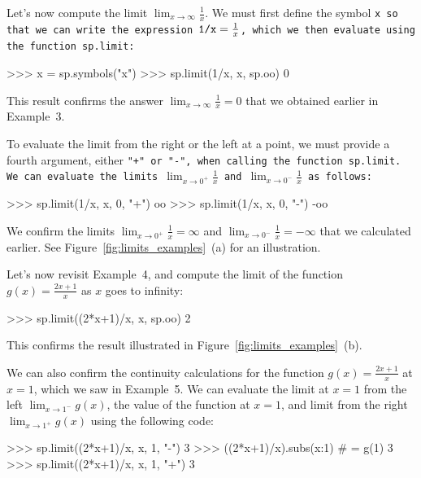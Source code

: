		Let's now compute the limit $\lim_{x \to \infty} \tfrac{1}{x}$.
		We must first define the symbol \tt{x}
		so that we can write the expression $\tt{1/x} = \frac{1}{x}$,
		which we then evaluate using the function \tt{sp.limit}:

		\begin{codeblock}[]
		>>> x = sp.symbols("x")
		>>> sp.limit(1/x, x, sp.oo)
		0
		\end{codeblock}

		\noindent
		This result confirms the answer $\lim_{x \to \infty} \tfrac{1}{x}=0$
		that we obtained earlier in Example~3.


		To evaluate the limit from the right or the left at a point,
		we must provide a fourth argument,
		either \tt{"+"} or \tt{"-"},
		when calling the function \tt{sp.limit}.
		We can evaluate the limits $\lim_{x \to 0^+} \tfrac{1}{x}$
		and $\lim_{x \to 0^-} \tfrac{1}{x}$ as follows:

		\begin{codeblock}[]
		>>> sp.limit(1/x, x, 0, "+")
		oo
		>>> sp.limit(1/x, x, 0, "-")
		-oo
		\end{codeblock}
		
		\noindent
		We confirm the limits $\lim_{x \to 0^+} \tfrac{1}{x} = \infty$
		and $\lim_{x \to 0^-} \tfrac{1}{x} = -\infty$
		that we calculated earlier.
		See Figure~\ref{fig:limits_examples}~(a) for an illustration.


		Let's now revisit Example~4,
		and compute the limit of the function $g(x) = \frac{2x+1}{x}$ as $x$ goes to infinity:

		\begin{codeblock}[]
		>>> sp.limit((2*x+1)/x, x, sp.oo)
		2
		\end{codeblock}

		This confirms the result illustrated in Figure~\ref{fig:limits_examples}~(b).


		We can also confirm the continuity calculations
		for the function $g(x) = \frac{2x+1}{x}$ at $x=1$,
		which we saw in Example~5.
		We can evaluate the limit at $x=1$ from the left $\lim_{x \to 1^-} g(x)$,
		the value of the function at $x=1$,
		and limit from the right $\lim_{x \to 1^+} g(x)$
		using the following code:

		\begin{codeblock}[]
		>>> sp.limit((2*x+1)/x, x, 1, "-")
		3
		>>> ((2*x+1)/x).subs({x:1})  # = g(1)
		3
		>>> sp.limit((2*x+1)/x, x, 1, "+")
		3
		\end{codeblock}
		
